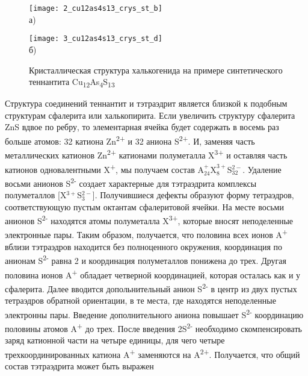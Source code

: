 \begin{figure}[pt!]
  \begin{minipage}[ht]{0.99\linewidth}\centering
    \texttt{[image: 2\_cu12as4s13\_crys\_st\_b]} \\ а)
  \end{minipage}
  \vfill
  \begin{minipage}[ht]{0.99\linewidth}\centering
    \texttt{[image: 3\_cu12as4s13\_crys\_st\_d]} \\ б)
  \end{minipage}

      \caption[Кристаллическая структура халькогенида на примере синтетического теннантита Cu\textsubscript{12}As\textsubscript{4}S\textsubscript{13}]{Кристаллическая структура халькогенида на примере синтетического теннантита Cu\textsubscript{12}As\textsubscript{4}S\textsubscript{13}}
    \label{img:figure1}
\end{figure}

Структура соединений теннантит и тэтраэдрит является близкой к подобным структурам сфалерита или халькопирита\cite{Pauling1934}. 
Если увеличить структуру сфалерита ZnS вдвое по ребру, то элементарная ячейка будет содержать в восемь раз больше атомов: 32 катиона Zn\textsuperscript{2+} и 32 аниона S\textsuperscript{2+}. И, заменяя часть металлических катионов Zn\textsuperscript{2+} катионами полуметалла X\textsuperscript{3+} и оставляя часть катионов одновалентными X\textsuperscript{+}, мы получаем состав A$^{+}_{24}$X$^{3+}_{8}$S$^{2-}_{32}$. Удаление восьми анионов S\textsuperscript{2-} создает характерные для тэтраэдрита комплексы полуметаллов [X$^{3+}$S$^{2-}_{3}$]. Получившиеся дефекты образуют форму тетраэдров, соответствующую пустым октантам сфалеритовой ячейки. На месте восьми анионов S\textsuperscript{2-} находятся атомы полуметалла  X\textsuperscript{3+}, которые вносят  неподеленные электронные пары. Таким образом, получается, что половина всех ионов A\textsuperscript{+} вблизи тэтраэдров находится без полноценного окружения, координация по анионам S\textsuperscript{2-} равна 2 и координация полуметаллов понижена до трех. Другая половина ионов A\textsuperscript{+} обладает четверной координацией, которая осталась как и у сфалерита. Далее вводится допольнительный анион S\textsuperscript{2-} в центр из двух пустых тетраэдров обратной ориентации, в те места, где находятся неподеленные электронны пары. Введение дополнительного аниона повышает S\textsuperscript{2-}  координацию половины атомов A\textsuperscript{+} до трех. После введения 2S\textsuperscript{2-} необходимо скомпенсировать заряд катионной части на четыре единицы, для чего четыре трехкоординированных катиона A\textsuperscript{+} заменяются на A\textsuperscript{2+}. Получается, что общий состав тэтраэдрита может быть выражен 

